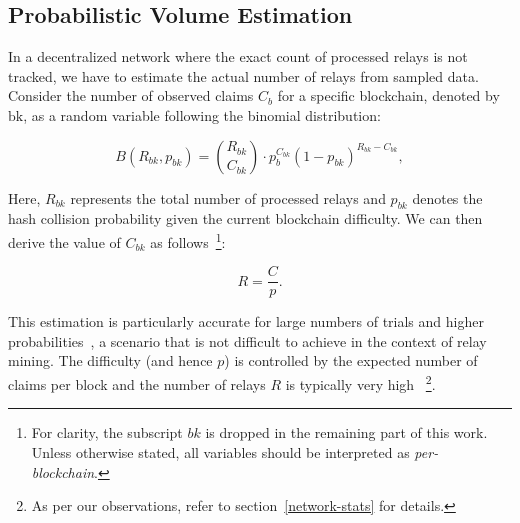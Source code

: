 \documentclass[runningheads]{llncs}
\begin{document}



\subsection{Probabilistic Volume Estimation}\label{volume-estimate}

In a decentralized network where the exact count of processed relays is not tracked, we have to estimate the actual number of relays from sampled data. Consider the number of observed claims $C_b$ for a specific blockchain, denoted by $\mbox{bk}$, as a random variable following the binomial distribution:

\begin{equation}
    B(R_{bk}, p_{bk}) = \binom{R_{bk}}{C_{bk}} \cdot p_b^{C_{bk}} (1-p_{bk})^{R_{bk}-C_{bk}}, 
\end{equation}

Here, $R_{bk}$ represents the total number of processed relays and $p_{bk}$ denotes the hash collision probability given the current blockchain difficulty. We can then derive the value of $C_{bk}$ as follows~\footnote{For clarity, the subscript ${bk}$ is dropped in the remaining part of this work. Unless otherwise stated, all variables should be interpreted as \emph{per-blockchain}.}:

\begin{equation}
    R = \frac{C}{p}.
\end{equation}

This estimation is particularly accurate for large numbers of trials and higher probabilities~\cite{blumenthal1981estimating}, a scenario that is not difficult to achieve in the context of relay mining. The difficulty (and hence $p$) is controlled by the expected number of claims per block and the number of relays $R$ is typically very high ~\footnote{As per our observations, refer to section~\ref{network-stats} for details.}.
\end{document}
